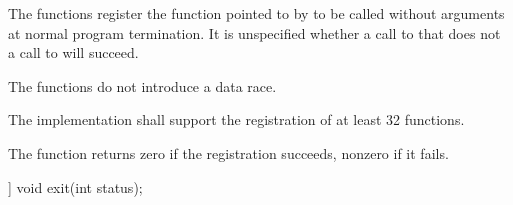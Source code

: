 \begin{itemdescr}
\pnum
\effects
The
functions register the function pointed to by 
to be called without arguments at normal program termination.
It is unspecified whether a call to  that does not
a call to  will succeed.
\begin{note} The  functions do not introduce a data
race. \end{note}

\pnum
\implimits
The implementation shall support the registration of at least 32 functions.

\pnum
\returns
The
function returns zero if the registration succeeds,
nonzero if it fails.
\end{itemdescr}

\begin{indexed}{}
\begin{itemdecl}
[[noreturn]] void exit(int status);
\end{itemdecl}
\end{indexed}

